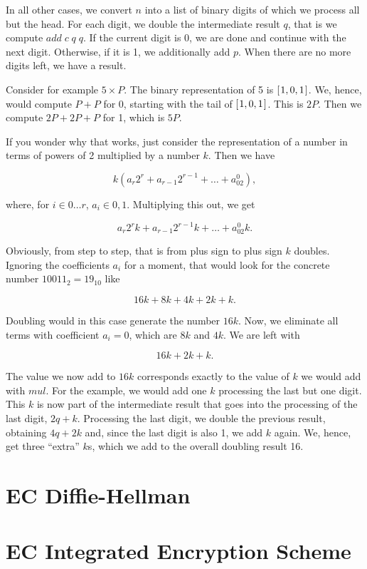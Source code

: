 \documentclass[tikz]{scrreprt}
\newcommand{\Varid}[1]{\mathit{#1}}
\begin{document}
In all other cases, we convert $n$ into a list
of binary digits of which we process all but the head.
For each digit, we double the intermediate result $q$,
that is we compute \ensuremath{\Varid{add}\;\Varid{c}\;\Varid{q}\;\Varid{q}}.
If the current digit is 0, we are done and continue
with the next digit.
Otherwise, if it is 1, we additionally add $p$.
When there are no more digits left,
we have a result.

Consider for example $5 \times P$.
The binary representation of 5 is \ensuremath{[\mskip1.5mu \mathrm{1},\mathrm{0},\mathrm{1}\mskip1.5mu]}.
We, hence, would compute $P+P$ for 0, starting with the tail of \ensuremath{[\mskip1.5mu \mathrm{1},\mathrm{0},\mathrm{1}\mskip1.5mu]}.
This is $2P$. Then we compute $2P+2P+P$ for 1,
which is $5P$.

If you wonder why that works, just consider
the representation of a number in terms of
powers of 2 multiplied by a number $k$.
Then we have

\[
k(a_r2^r + a_{r-1}2^{r-1} + \dots + a_02^0),
\]

where, for $i \in {0\dots r}$, $a_i \in {0,1}$.
Multiplying this out, we get

\[
a_r2^rk + a_{r-1}2^{r-1}k + \dots + a_02^0k.
\]

Obviously, from step to step, that is from plus sign
to plus sign $k$ doubles. Ignoring the coefficients $a_i$
for a moment, that would look for the concrete number
$10011_2 = 19_{10}$ like

\[
16k + 8k + 4k + 2k + k.
\]

Doubling would in this case generate the number $16k$.
Now, we eliminate all terms with coefficient $a_i = 0$,
which are $8k$ and $4k$. We are left with

\[
16k + 2k + k.
\]

The value we now add to $16k$ corresponds exactly
to the value of $k$ we would add with \ensuremath{\Varid{mul}}. For the example,
we would add one $k$ processing the last but one digit.
This $k$ is now part of the intermediate result that
goes into the processing of the last digit, $2q+k$.
Processing the last digit, we double the previous result,
obtaining $4q+2k$ and, since the last digit is also 1,
we add $k$ again. We, hence, get three ``extra'' $k$s,
which we add to the overall doubling result 16.
\section{EC Diffie-Hellman} 
\section{EC Integrated Encryption Scheme} 
\end{document}
